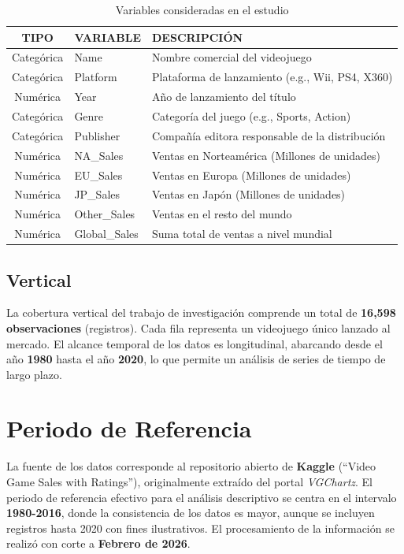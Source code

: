 \documentclass[oneside,11pt]{Latex/Classes/PhDthesisPSnPDF}
\begin{document}
\begin{table}[ht]
\centering
\caption{Variables consideradas en el estudio} 
\resizebox{12cm}{!} {
\begin{tabular}{cll}
  \hline
  \textbf{TIPO} & \textbf{VARIABLE} & \textbf{DESCRIPCIÓN} \\ 
  \hline
  Categórica & Name & Nombre comercial del videojuego \\ 
  Categórica & Platform & Plataforma de lanzamiento (e.g., Wii, PS4, X360) \\ 
  Numérica & Year & Año de lanzamiento del título \\ 
  Categórica & Genre & Categoría del juego (e.g., Sports, Action) \\ 
  Categórica & Publisher & Compañía editora responsable de la distribución \\ 
  Numérica & NA\_Sales & Ventas en Norteamérica (Millones de unidades) \\ 
  Numérica & EU\_Sales & Ventas en Europa (Millones de unidades) \\ 
  Numérica & JP\_Sales & Ventas en Japón (Millones de unidades) \\ 
  Numérica & Other\_Sales & Ventas en el resto del mundo \\ 
  Numérica & Global\_Sales & Suma total de ventas a nivel mundial \\ 
   \hline
\end{tabular}
}
\end{table}

\subsection{Vertical}

La cobertura vertical del trabajo de investigación comprende un total de
\textbf{16,598 observaciones} (registros). Cada fila representa un
videojuego único lanzado al mercado. El alcance temporal de los datos es
longitudinal, abarcando desde el año \textbf{1980} hasta el año
\textbf{2020}, lo que permite un análisis de series de tiempo de largo
plazo.

\section{Periodo de Referencia}

La fuente de los datos corresponde al repositorio abierto de
\textbf{Kaggle} (``Video Game Sales with Ratings''), originalmente
extraído del portal \emph{VGChartz}. El periodo de referencia efectivo
para el análisis descriptivo se centra en el intervalo
\textbf{1980-2016}, donde la consistencia de los datos es mayor, aunque
se incluyen registros hasta 2020 con fines ilustrativos. El
procesamiento de la información se realizó con corte a \textbf{Febrero
de 2026}.
\end{document}
